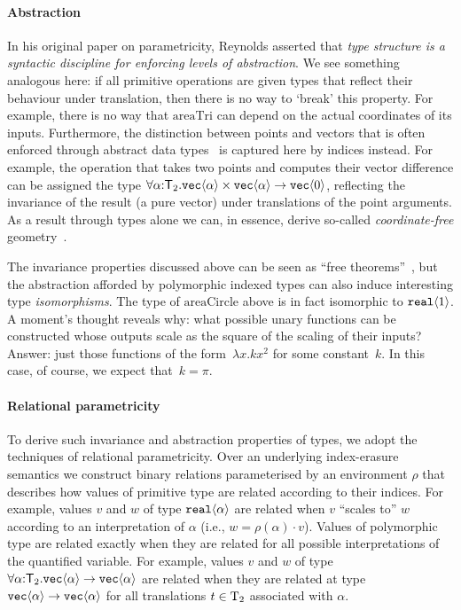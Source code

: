 \paragraph{Abstraction}
In his original paper on parametricity, Reynolds asserted that
\emph{type structure is a syntactic discipline for enforcing levels of
  abstraction}.  We see something analogous here: if all primitive
operations are given types that reflect their behaviour under
translation, then there is no way to `break' this property. For
example, there is no way that $\mathrm{areaTri}$ can depend on the
actual coordinates of its inputs. Furthermore, the distinction between
points and vectors that is often enforced through abstract data
types~\cite{CGAL} is captured here by indices instead. For example,
the operation that takes two points and computes their vector
difference can be assigned the type
$\forall\alpha\mathord:\mathsf{T}_2.\textup{\texttt{vec}}\langle \alpha \rangle\times\textup{\texttt{vec}}\langle \alpha \rangle\to\textup{\texttt{vec}}\langle 0 \rangle$,
reflecting the invariance of the result (a pure vector) under
translations of the point arguments. As a result through types alone
we can, in essence, derive so-called \emph{coordinate-free}
geometry~\cite{CFGADT}.

The invariance properties discussed above can be seen as ``free
theorems''~\cite{wadler89theorems}, but the abstraction afforded by
polymorphic indexed types can also induce interesting type
\emph{isomorphisms}.  The type of $\mathrm{areaCircle}$ above is in
fact isomorphic to $\textup{\texttt{real}}\langle 1 \rangle$. A moment's thought reveals why:
what possible unary functions can be constructed whose outputs scale
as the square of the scaling of their inputs?  Answer: just those
functions of the form~$\lambda x. k x^2$ for some constant~$k$.  In
this case, of course, we expect that~$k = \pi$.

\paragraph{Relational parametricity}
To derive such invariance and abstraction properties of types, we
adopt the techniques of relational parametricity. Over an underlying
index-erasure semantics we construct binary relations parameterised by
an environment $\rho$ that describes how values of primitive type are
related according to their indices.  For example, values $v$ and $w$
of type $\textup{\texttt{real}}\langle \alpha \rangle$ are related when $v$ ``scales to'' $w$
according to an interpretation of $\alpha$ (i.e., $w=\rho(\alpha)\cdot
v$).  Values of polymorphic type are related exactly when they are
related for all possible interpretations of the quantified
variable. For example, values $v$ and $w$ of type
$\forall\alpha\mathord:\mathsf{T}_2.\textup{\texttt{vec}}\langle \alpha \rangle\to
\textup{\texttt{vec}}\langle \alpha \rangle$ are related when they are related at type
$\textup{\texttt{vec}}\langle \alpha \rangle\to\textup{\texttt{vec}}\langle \alpha \rangle$ for all translations
$t\in\mathrm{T}_2$ associated with $\alpha$.

